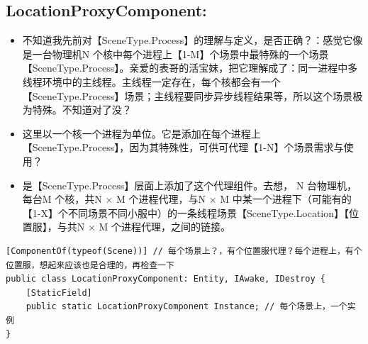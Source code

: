 \documentclass[9pt, b5paper]{article}
\begin{document}
\subsection{LocationProxyComponent:}
\label{sec-5-3}
\begin{itemize}
\item 不知道我先前对【SceneType.Process】的理解与定义，是否正确？：感觉它像是一台物理机N 个核中每个进程上【1-M】个场景中最特殊的一个场景【SceneType.Process】。亲爱的表哥的活宝妹，把它理解成了：同一进程中多线程环境中的主线程。主线程一定存在，每个核都会有一个【SceneType.Process】场景；主线程要同步异步线程结果等，所以这个场景极为特殊。不知道对了没？
\item 这里以一个核一个进程为单位。它是添加在每个进程上【SceneType.Process】，因为其特殊性，可供可代理【1-N】个场景需求与使用？
\item 是【SceneType.Process】层面上添加了这个代理组件。去想， N 台物理机，每台M 个核，共N × M 个进程代理，与N × M 中某一个进程下（可能有的【1-X】个不同场景不同小服中）的一条线程场景【SceneType.Location】【位置服】，与共N × M 个进程代理，之间的链接。
\end{itemize}
\begin{verbatim}
[ComponentOf(typeof(Scene))] // 每个场景上？，有个位置服代理？每个进程上，有个位置服，想起来应该也是合理的，再检查一下
public class LocationProxyComponent: Entity, IAwake, IDestroy {
    [StaticField]
    public static LocationProxyComponent Instance; // 每个场景上，一个实例
}
\end{verbatim}
\end{document}
